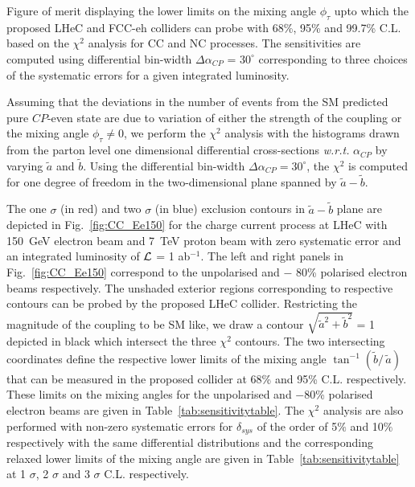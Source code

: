 \documentclass[pdftex,twocolumn,epjc3]{svjour3}          %
\begin{document}
\begin{table*}[t]
\caption{{\small Figure of merit displaying the lower limits on the  mixing angle $\phi_\tau $ upto which the proposed LHeC and FCC-eh colliders can probe with   68\%, 95\% and 99.7\% C.L. based on the  $\chi^2$ analysis for CC and NC processes. The sensitivities are computed using  differential   bin-width $\Delta\alpha_{CP}$ = $30^\circ$ corresponding to three choices of the systematic errors for a given integrated  luminosity. } }
			\label{tab:sensitivitytable}   
		\end{table*}
%
\par Assuming that the deviations in the number of events from the SM predicted pure $CP$-even state are due to  variation of either the strength of the coupling or the mixing angle $\phi_\tau\ne 0$, we perform the $\chi^2$  analysis with  the  histograms drawn from the parton level one  dimensional differential cross-sections {\it w.r.t.} $\alpha_{CP}$  by varying $\tilde a$ and $\tilde b$. Using the differential bin-width $\Delta\alpha_{CP}=30^\circ$, the $\chi^2$ is computed for one degree of freedom in the two-dimensional plane spanned by $\tilde a- \tilde b$. 

\par The one $\sigma$ (in red) and two $\sigma$ (in blue) exclusion contours in $\tilde a-\tilde b$ plane are depicted in Fig.~\ref{fig:CC_Ee150} for the charge current process at LHeC with 150~GeV  electron beam and 7~TeV  proton beam with zero systematic error and an integrated luminosity of $\cal L$ = 1 ab$^{-1}$. The left and right panels in Fig.~\ref{fig:CC_Ee150} correspond to the unpolarised and $-$ 80\% polarised electron beams respectively. The unshaded exterior regions corresponding to respective contours  can be probed by the proposed LHeC collider. Restricting the magnitude of the coupling to be SM like, we draw a contour  $\sqrt{\tilde a^2 + \tilde b^2}$ = 1 depicted in black which intersect the three $\chi^2$ contours. The two intersecting coordinates define the  respective lower limits of the mixing angle $\tan^{-1}\left(\tilde b/\,\tilde a\right)$ that can be measured in the proposed collider at 68\% and 95\%  C.L. respectively. These limits on the mixing angles  for  the unpolarised and $-$80\% polarised electron beams are given in Table~\ref{tab:sensitivitytable}. The $\chi^2$ analysis 
are also performed with non-zero systematic errors for  $\delta_{sys}$ of the order of  5$\%$ and 10$\%$ respectively with the same differential distributions and the corresponding relaxed  lower limits of the mixing angle  are given in Table~\ref{tab:sensitivitytable} at 1 $\sigma$, 2 $\sigma$ and 3 $\sigma$ C.L. respectively.
\end{document}
